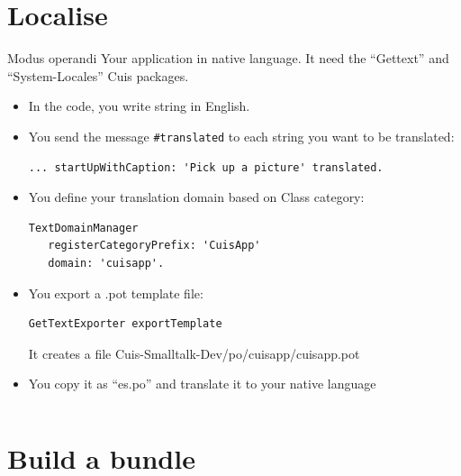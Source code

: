 \documentclass{beamer}
\begin{document}
\section{Localise}
\begin{frame}[fragile]{ Modus operandi}
\fontsize{10pt}{8pt}\selectfont
  Your application in native language. It need the ``Gettext'' and
  ``System-Locales'' Cuis packages.
  \begin{itemize}
  \item In the code, you write string in English. 
  \item You send the message \texttt{\#translated} to each string you
    want to be translated:
    \begin{lstlisting}[language=Smalltalk]
... startUpWithCaption: 'Pick up a picture' translated.
    \end{lstlisting}
  \item You define your translation domain based on Class category:
    \begin{lstlisting}[language=Smalltalk]
TextDomainManager
   registerCategoryPrefix: 'CuisApp'
   domain: 'cuisapp'.
    \end{lstlisting}
  \item You export a .pot template file:
    \begin{lstlisting}[language=Smalltalk]
GetTextExporter exportTemplate
\end{lstlisting}
It creates a file Cuis-Smalltalk-Dev/po/cuisapp/cuisapp.pot
\item You copy it as ``es.po'' and translate it to your native
  language
  \end{itemize}
\end{frame}

\begin{lstlisting}[language=Smalltalk]
\end{lstlisting}

\section{Build a bundle}
\end{document}
